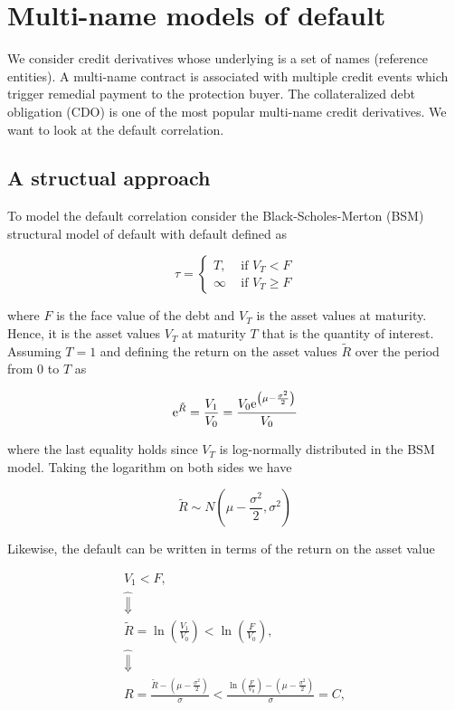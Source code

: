 \section{Multi-name models of default}
We consider credit derivatives whose underlying is a set of names (reference entities). A multi-name contract is associated with multiple credit events which trigger remedial payment to the protection buyer. The collateralized debt obligation (CDO) is one of the most popular multi-name credit derivatives. We want to look at the default correlation.

\subsection{A structual approach}
To model the default correlation consider the Black-Scholes-Merton (BSM) structural model of default with default defined as

$$
\tau= \begin{cases}T, & \text { if } V_{T}<F \\ \infty & \text { if } V_{T} \geq F\end{cases}
$$

where $F$ is the face value of the debt and $V_{T}$ is the asset values at maturity. Hence, it is the asset values $V_{T}$ at maturity $T$ that is the quantity of interest. Assuming $T=1$ and defining the return on the asset values $\tilde{R}$ over the period from 0 to $T$ as

$$
\mathrm{e}^{\tilde{R}}=\frac{V_{1}}{V_{0}}=\frac{V_{0} \mathrm{e}^{\left(\mu-\frac{\sigma^{2}}{2}\right)}}{V_{0}}
$$

where the last equality holds since $V_{T}$ is log-normally distributed in the BSM model. Taking the logarithm on both sides we have

$$
\tilde{R} \sim N\left(\mu-\frac{\sigma^{2}}{2}, \sigma^{2}\right)
$$

Likewise, the default can be written in terms of the return on the asset value

$$
\begin{gathered}
V_{1}<F, \\
\widehat{\Downarrow} \\
\tilde{R}=\ln \left(\frac{V_{1}}{V_{0}}\right)<\ln \left(\frac{F}{V_{0}}\right), \\
\widehat{\Downarrow} \\
R=\frac{\tilde{R}-\left(\mu-\frac{\sigma^{2}}{2}\right)}{\sigma}<\frac{\ln \left(\frac{F}{V_{0}}\right)-\left(\mu-\frac{\sigma^{2}}{2}\right)}{\sigma}=C,
\end{gathered}
$$

